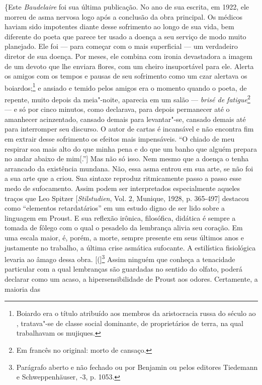 \{Este \emph{Baudelaire} foi sua última publicação. No ano de sua
escrita, em 1922, ele morreu de asma nervosa logo após a conclusão da
obra principal. Os médicos haviam sido impotentes diante desse
sofrimento ao longo de sua vida, bem diferente do poeta que parece ter
usado a doença a seu serviço de modo muito planejado. Ele foi --- para
começar com o mais superficial --- um verdadeiro diretor de sua doença.
Por meses, ele combina com ironia devastadora a imagem de um devoto que
lhe enviara flores, com um cheiro insuportável para ele. Alerta os
amigos com os tempos e pausas de seu sofrimento como um czar alertava os
boiardos;\footnote{Boiardo era o título atribuído aos membros da
  aristocracia russa do século  ao , tratava"-se de classe social
  dominante, de proprietários de terra, na qual trabalhavam os mujiques. \versal{[N. E.]}}
e ansiado e temido pelos amigos era o momento quando o poeta, de
repente, muito depois da meia"-noite, aparecia em um salão --- \emph{brisé
de fatigue}\footnote{Em francês no original: morto de cansaço. \versal{[N. T.]}}
--- e só por cinco minutos, como declarava, para depois permanecer até o
amanhecer acinzentado, cansado demais para levantar"-se, cansado demais
até para interromper seu discurso. O autor de cartas é incansável e não
encontra fim em extrair desse sofrimento os efeitos mais impensáveis. ``O
chiado de meu respirar soa mais alto do que minha pena e do que um banho
que alguém prepara no andar abaixo de mim{[}.''{]} Mas não só isso. Nem
mesmo que a doença o tenha arrancado da existência mundana. Não, essa
asma entrou em sua arte, se não foi a sua arte que a criou. Sua sintaxe
reproduz ritmicamente passo a passo esse medo de sufocamento. Assim
podem ser interpretados especialmente aqueles traços que Leo Spitzer
{[}\emph{Stilstudien}, Vol. 2, Munique, 1928, p. 365-497{]} destacou como
``elementos retardatários'' em um estudo digno de ser lido sobre a
linguagem em Proust. E sua reflexão irônica, filosófica, didática é
sempre a tomada de fôlego com o qual o pesadelo da lembrança alivia seu
coração. Em uma escala maior, é, porém, a morte, sempre presente em seus
últimos anos e justamente no trabalho, a última crise asmática
sufocante. A estilística fisiológica levaria ao âmago dessa obra. {[}({]}\footnote{Parágrafo aberto e não fechado ou por Benjamin ou pelos
  editores Tiedemann e Schweppenhäuser, -3, p. 1053. \versal{[N. T.]}} Assim
ninguém que conheça a tenacidade particular com a qual lembranças são
guardadas no sentido do olfato, poderá declarar como um acaso, a
hipersensibilidade de Proust aos odores. Certamente, a maioria das
